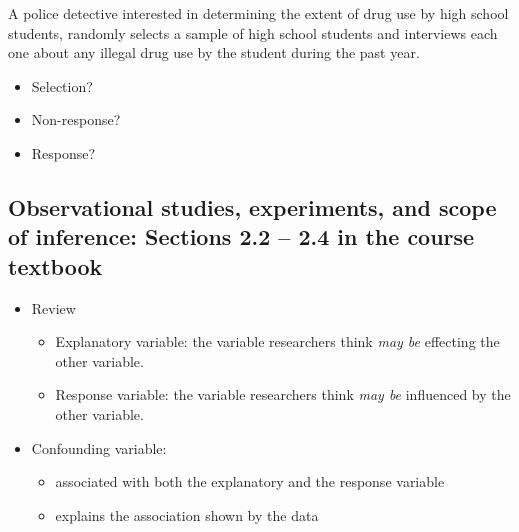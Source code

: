 \documentclass[
]{report}
\providecommand{\tightlist}{%
  \setlength{\itemsep}{0pt}\setlength{\parskip}{0pt}}
\begin{document}
\vspace{0.25in}

A police detective interested in determining the extent of drug use by high school students, randomly selects a sample of high school students and interviews each one about any illegal drug use by the student during the past year.

\begin{itemize}
\tightlist
\item
  Selection?
\end{itemize}

\vspace{0.25in}

\begin{itemize}
\tightlist
\item
  Non-response?
\end{itemize}

\vspace{0.25in}

\begin{itemize}
\tightlist
\item
  Response?
\end{itemize}

\vspace{0.25in}

\hypertarget{observational-studies-experiments-and-scope-of-inference-sections-2.2-2.4-in-the-course-textbook}{%
\subsection*{Observational studies, experiments, and scope of inference: Sections 2.2 -- 2.4 in the course textbook}\label{observational-studies-experiments-and-scope-of-inference-sections-2.2-2.4-in-the-course-textbook}}

\begin{itemize}
\item
  Review

  \begin{itemize}
  \item
    Explanatory variable: the variable researchers think \emph{may be} effecting the other variable.
  \item
    Response variable: the variable researchers think \emph{may be} influenced by the other variable.
  \end{itemize}
\item
  Confounding variable:

  \begin{itemize}
  \tightlist
  \item
    associated with both the explanatory and the response variable
  \item
    explains the association shown by the data
  \end{itemize}
\end{itemize}
\end{document}
